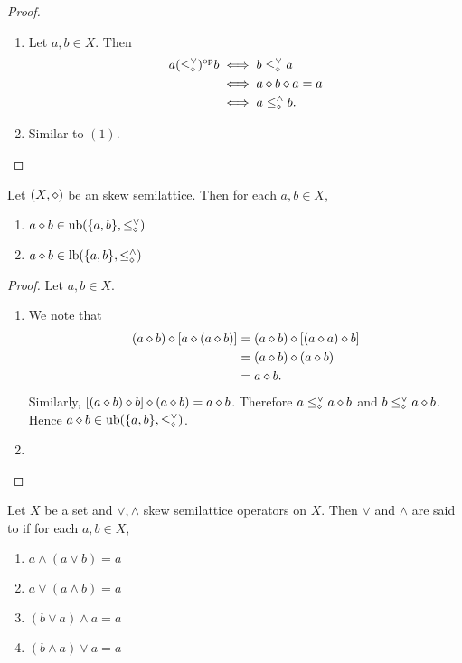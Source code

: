 \documentclass{book}
\begin{document}
	\begin{proof}\
		\begin{enumerate}
			\item Let $a,b \in X$. Then 
			\begin{align*}
				a (\leq^{\vee}_{\diamond})^{\text{op}} b 
				& \iff b \leq^{\vee}_{\diamond} a \\
				& \iff a \diamond b \diamond a = a \\
				& \iff a \leq^{\wedge}_{\diamond} b.
			\end{align*}
			\item Similar to $(1)$.
		\end{enumerate}
	\end{proof}
	
	\begin{ex} 
		Let $(X, \diamond)$ be an skew semilattice. Then for each $a,b \in X$, 
		\begin{enumerate}
			\item $a \diamond b \in \operatorname{ub}( \{a,b\}, \leq_{\diamond}^{\vee})$
			\item $a \diamond b \in \operatorname{lb}( \{a,b\}, \leq_{\diamond}^{\wedge})$
		\end{enumerate}
	\end{ex}
	
	\begin{proof} 
		Let $a,b \in X$.
		\begin{enumerate}
			\item 
			We note that 
			\begin{align*}
				(a \diamond b) \diamond [a \diamond (a \diamond b) ]
				& = (a \diamond b) \diamond [(a \diamond a) \diamond b] \\
				& = (a \diamond b) \diamond (a \diamond b) \\
				& = a \diamond b. 
			\end{align*}
			Similarly, $[(a \diamond b) \diamond b] \diamond (a \diamond b) = a \diamond b$. Therefore $a \leq_{\diamond}^{\vee} a \diamond b$ and $b \leq_{\diamond}^{\vee} a \diamond b$. Hence $a \diamond b \in \operatorname{ub}( \{a,b\}, \leq_{\diamond}^{\vee})$.
			\item \tcr{FINISH!!!}
		\end{enumerate}
	\end{proof}
	
	\begin{defn} 
		Let $X$ be a set and $\vee, \wedge$ skew semilattice operators on $X$. Then $\vee$ and $\wedge$ are said to   if for each $a,b \in X$,
		\begin{enumerate}
			\item $a \wedge (a \vee b) = a$
			\item $a \vee (a \wedge b) = a$
			\item $(b \vee a) \wedge a = a$
			\item $(b \wedge a) \vee a = a$
		\end{enumerate} 
	\end{defn}
	
\end{document}
